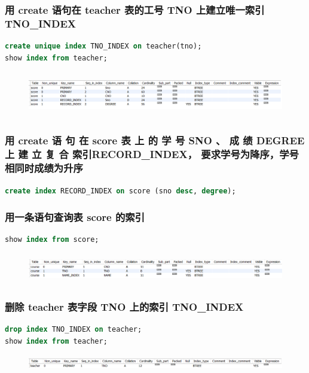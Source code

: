 \documentclass{ctexart}
\begin{document}
\subsubsection{用 create 语句在 teacher 表的工号 TNO 上建立唯一索引 TNO\_INDEX}
\begin{lstlisting}[language=sql]
create unique index TNO_INDEX on teacher(tno);
show index from teacher;
\end{lstlisting}
\begin{figure}[H]
	\centering 
	\includegraphics[height=2cm,width=16cm]{20.png}
	\end{figure}
\subsubsection{用 create 语 句 在 score 表 上 的 学 号 SNO 、 成 绩 DEGREE 上 建 立 复 合 索引RECORD\_INDEX， 要求学号为降序，学号相同时成绩为升序}
\begin{lstlisting}[language=sql]
	create index RECORD_INDEX on score (sno desc, degree);
\end{lstlisting}

\subsubsection{用一条语句查询表 score 的索引}
\begin{lstlisting}[language=sql]
	show index from score;
\end{lstlisting}
\begin{figure}[H]
	\centering 
	\includegraphics[height=1.3cm,width=16cm]{21.png}
	\end{figure}
\subsubsection{删除 teacher 表字段 TNO 上的索引 TNO\_INDEX}
\begin{lstlisting}[language=sql]
drop index TNO_INDEX on teacher;
show index from teacher;
\end{lstlisting}
\begin{figure}[H]
	\centering 
	\includegraphics[height=0.7cm,width=16cm]{22.png}
	\end{figure}
\end{document}
